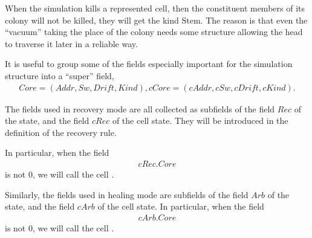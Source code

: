 \documentclass[12pt]{memoir}
\newcommand{\fld}[1]{\ensuremath{\textit{#1}}}
\newcommand{\Z}{Z}
\newcommand{\Addr}{\fld{Addr}}
\newcommand{\cAddr}{\fld{cAddr}}
\newcommand{\Arb}{\fld{Arb}}
\newcommand{\cArb}{\fld{cArb}}
\newcommand{\Core}{\fld{Core}}
\newcommand{\cCore}{\fld{cCore}}
\newcommand{\Drift}{\fld{Drift}}
\newcommand{\cDrift}{\fld{cDrift}}
\newcommand{\Kind}{\fld{Kind}}
\newcommand{\cKind}{\fld{cKind}}
\newcommand{\Rec}{\fld{Rec}}
\newcommand{\cRec}{\fld{cRec}}
\newcommand{\Sweep}{\fld{Sw}}
\newcommand{\cSweep}{\fld{cSw}}
\newcommand{\ZigDepth}{\fld{ZigDepth}}
\newcommand{\ZigDir}{\fld{ZigDir}}
\newcommand{\Stem}{\mathrm{Stem}}
\begin{document}
When the simulation kills a represented cell, then the constituent members
of its colony will not be killed, they will get the kind \( \Stem \).
The reason is that even the ``vacuum'' taking the place of the colony needs some
structure allowing the head to traverse it later in a reliable way.

It is useful to group some of the fields especially important for the simulation structure into
a ``super'' field,
    \begin{align}\label{eq:Core}
       \Core=(\Addr, \Sweep, \Drift, \Kind), 
        \cCore=(\cAddr, \cSweep, \cDrift, \cKind). %
    \end{align}


  The fields used in recovery mode are all collected as subfields of the field
    \( \Rec \) of the state, and the field \( \cRec \) of the cell state.
    They will be introduced in the definition of the recovery rule.

    In particular, when the field
     \begin{align}\label{eq:cRecCore}
      \cRec.\Core
     \end{align}
    is not \( 0 \), we will call the cell .

    Similarly, the fields used in healing mode are subfields of the field \( \Arb \) of the state,
    and the field \( \cArb \) of the cell state.
    In particular, when the field
     \begin{align}\label{eq:cArbCore}
      \cArb.\Core
     \end{align}
    is not \( 0 \), we will call the cell .

\end{document}
